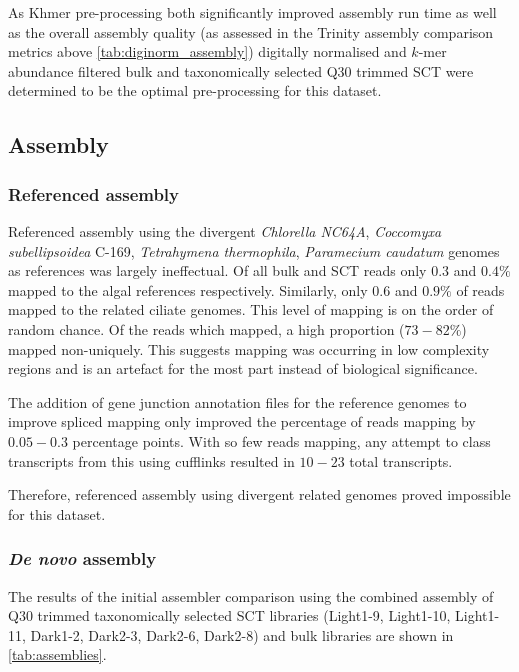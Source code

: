 As Khmer pre-processing both significantly improved assembly run time as well as the overall
assembly quality (as assessed in the Trinity assembly comparison metrics above \cref{tab:diginorm_assembly})
digitally normalised and \(k\)-mer abundance filtered bulk and taxonomically selected Q30
trimmed SCT were determined to be the optimal pre-processing for this dataset. 

\subsection{Assembly}

\subsubsection{Referenced assembly}

Referenced assembly using the divergent \textit{Chlorella NC64A},
\textit{Coccomyxa subellipsoidea} C-169, \textit{Tetrahymena thermophila},
\textit{Paramecium caudatum} genomes as references was largely ineffectual.
Of all bulk and SCT reads only \(0.3\) and \(0.4\%\) mapped to the 
algal references respectively.  Similarly, only \(0.6\) and \(0.9\%\) of reads mapped 
to the related ciliate genomes.   This level of mapping is on the order
of random chance. Of the reads which mapped, a high proportion (\(73-82\%\))
mapped non-uniquely. 
This suggests mapping was occurring in low complexity regions and is an
artefact for the most part instead of biological significance.

The addition of gene junction annotation files for the reference genomes to improve
spliced mapping only improved the percentage of reads mapping by \(0.05-0.3\) percentage points.  
With so few reads mapping, any attempt to class transcripts from this using cufflinks 
resulted in \(10-23\) total transcripts.

Therefore, referenced assembly using divergent related genomes proved impossible
for this dataset.

\subsubsection{\textit{De novo} assembly} 

The results of the initial assembler comparison using the combined assembly of 
Q30 trimmed taxonomically selected SCT libraries (Light1-9, Light1-10, Light1-11, 
Dark1-2, Dark2-3, Dark2-6, Dark2-8) and bulk libraries are shown in
\cref{tab:assemblies}. 

